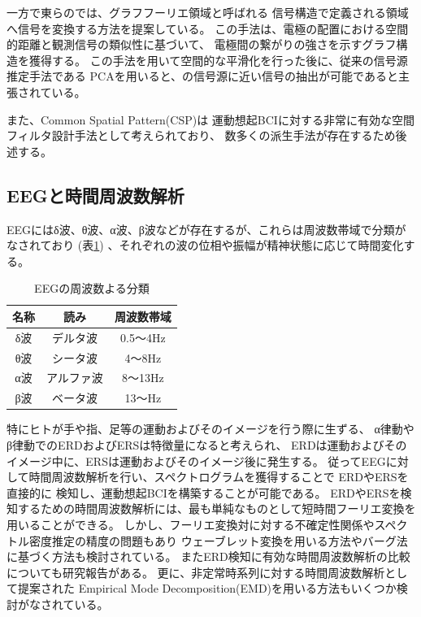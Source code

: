 一方で東らの\cite{グラフフーリエ}では、グラフフーリエ領域と呼ばれる
信号構造で定義される領域へ信号を変換する方法を提案している。
この手法は、電極の配置における空間的距離と観測信号の類似性に基づいて、
電極間の繋がりの強さを示すグラフ構造を獲得する。
この手法を用いて空間的な平滑化を行った後に、従来の信号源推定手法である
PCAを用いると、の信号源に近い信号の抽出が可能であると主張されている。

また、Common Spatial Pattern(CSP)は
運動想起BCIに対する非常に有効な空間フィルタ設計手法として考えられており、
数多くの派生手法が存在するため後述する。

\subsection{\mc EEGと時間周波数解析}
EEGにはδ波、θ波、α波、β波などが存在するが、これらは周波数帯域で分類がなされており
(表\ref{table:eegtype})
、それぞれの波の位相や振幅が精神状態に応じて時間変化する。
\begin{table}[tbp]
    \centering
    \caption{EEGの周波数よる分類}
    \begin{tabular}{|c|c|c|} \hline
        名称 & 読み & 周波数帯域 \\ 
        \hline
        δ波 & デルタ波 & 0.5〜4Hz \\ 
        \hline
        θ波 & シータ波 & 4〜8Hz \\ 
        \hline
        α波 & アルファ波 & 8〜13Hz \\ 
        \hline
        β波 & ベータ波 & 13〜Hz \\
        \hline
    \end{tabular}
    \label{table:eegtype}
\end{table}
特にヒトが手や指、足等の運動およびそのイメージを行う際に生ずる、
α律動やβ律動でのERDおよびERSは特徴量になると考えられ、
ERDは運動およびそのイメージ中に、ERSは運動およびそのイメージ後に発生する\cite{ERDとERS}。
従ってEEGに対して時間周波数解析を行い、スペクトログラムを獲得することで
ERDやERSを直接的に
検知し、運動想起BCIを構築することが可能である\cite{Beta波によるBCI}。
ERDやERSを検知するための時間周波数解析には、最も単純なものとして短時間フーリエ変換を用いることができる。
しかし、フーリエ変換対に対する不確定性関係やスペクトル密度推定の精度の問題もあり
ウェーブレット変換を用いる方法やバーグ法に基づく方法も検討されている。
またERD検知に有効な時間周波数解析の比較についても研究報告がある\cite{時間周波数解析の比較}。
更に、非定常時系列に対する時間周波数解析として提案された
Empirical Mode Decomposition(EMD)を用いる方法もいくつか検討がなされている\cite{EMD,IMF}。

